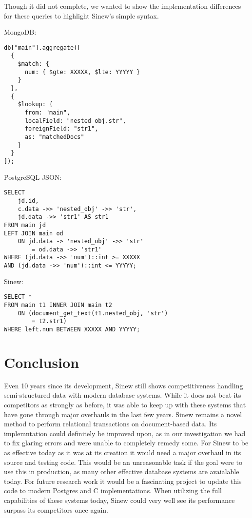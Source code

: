 \documentclass[sigconf]{acmart}
\begin{document}
Though it did not complete, we wanted to show the implementation differences for these queries to highlight Sinew's simple syntax.

\noindent
MongoDB:
\begin{tcolorbox}[colback=gray!10, colframe=gray!50, sharp corners, boxrule=0.1mm]
\begin{verbatim} 
db["main"].aggregate([
  {
    $match: {
      num: { $gte: XXXXX, $lte: YYYYY }
    }
  },
  {
    $lookup: {
      from: "main",
      localField: "nested_obj.str",
      foreignField: "str1",
      as: "matchedDocs"
    }
  }
]);
\end{verbatim}
\end{tcolorbox}

\noindent
PostgreSQL JSON:
\begin{tcolorbox}[colback=gray!10, colframe=gray!50, sharp corners, boxrule=0.1mm]
\begin{verbatim} 
SELECT 
    jd.id,
    c.data ->> 'nested_obj' ->> 'str',
    jd.data ->> 'str1' AS str1
FROM main jd
LEFT JOIN main od
    ON jd.data -> 'nested_obj' ->> 'str' 
        = od.data ->> 'str1'
WHERE (jd.data ->> 'num')::int >= XXXXX
AND (jd.data ->> 'num')::int <= YYYYY;
\end{verbatim}
\end{tcolorbox}

\noindent
Sinew:
\begin{tcolorbox}[colback=gray!10, colframe=gray!50, sharp corners, boxrule=0.1mm]
\begin{verbatim} 
SELECT *
FROM main t1 INNER JOIN main t2
    ON (document_get_text(t1.nested_obj, 'str') 
        = t2.str1)
WHERE left.num BETWEEN XXXXX AND YYYYY;  
\end{verbatim}
\end{tcolorbox}

\section{Conclusion}
Even 10 years since its development, Sinew still shows competitiveness handling semi-structured data with modern database systems. While it does not beat its competitors as strongly as before, it was able to keep up with these systems that have gone through major overhauls in the last few years. Sinew remains a novel method to perform relational transactions on document-based data. Its implemntation could definitely be improved upon, as in our investigation we had to fix glaring errors and were unable to completely remedy some. For Sinew to be as effective today as it was at its creation it would need a major overhaul in its source and testing code. This would be an unreasonable task if the goal were to use this in production, as many other effective database systems are avaialable today. For future research work it would be a fascinating project to update this code to modern Postgres and C implementations. When utilizing the full capabilities of these systems today, Sinew could very well see its performance surpass its competitors once again.



\end{document}
